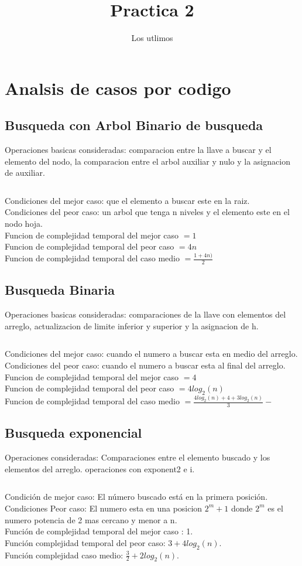 \documentclass[12pt]{report}
\title{Practica 2}
\author{Los utlimos}
\begin{document}
\maketitle
\section*{Analsis de casos por codigo}
\subsection*{Busqueda con Arbol Binario de busqueda}
Operaciones basicas consideradas: comparacion entre la llave a buscar y el elemento del nodo, la comparacion entre el arbol auxiliar y nulo y la asignacion de auxiliar.\\
\inputminted[firstline = 82, lastline = 91]{C}{babinario.c}
Condiciones del mejor caso: que el elemento a buscar este en la raiz.\\
Condiciones del peor caso: un arbol que tenga n niveles y el elemento este en el nodo hoja.\\
Funcion de complejidad temporal del mejor caso $= 1$\\
Funcion de complejidad temporal del peor caso $= 4n$\\
Funcion de complejidad temporal del caso medio $= \frac{1+4n)}{2}$
\newpage
\subsection*{Busqueda Binaria}
Operaciones basicas consideradas: comparaciones de la llave con elementos del arreglo, actualizacion de limite inferior y superior y la asignacion de h.\\
\inputminted[firstline = 15, lastline = 30]{C}{bbinaria.c}
Condiciones del mejor caso: cuando el numero a buscar esta en medio del arreglo.\\
Condiciones del peor caso: cuando el numero a buscar esta al final del arreglo.\\
Funcion de complejidad temporal del mejor caso $= 4$\\
Funcion de complejidad temporal del peor caso $= 4log_2(n)$\\
Funcion de complejidad temporal del caso medio $= \frac{4log_2(n) + 4 + 3log_2(n)}{3}-$
\newpage
\subsection*{Busqueda exponencial}
Operaciones consideradas: Comparaciones entre el elemento buscado y los elementos del arreglo. operaciones con exponent2 e i.\\
\inputminted[firstline = 32, lastline = 40]{C}{bexponencial.c}
Condición de mejor caso: El número buscado está en la primera posición. \\
Condiciones Peor caso: El numero esta en una posicion $2^m + 1$ donde $2^m$ es el numero potencia de 2 mas cercano y menor a n. \\
Función de complejidad temporal del mejor caso : 1.\\
Función complejidad temporal del peor caso: $3+4log_2(n)$. \\
Función complejidad caso medio: $\frac{3}{2}+2log_2(n)$.\\
\newpage
\end{document}
